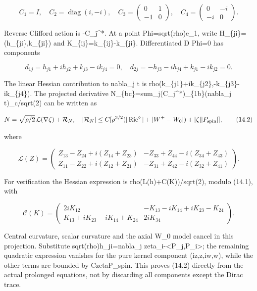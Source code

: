 \documentclass[
  10pt,
]{article}
\begin{document}
\[
 C_1=I,\quad C_2=\operatorname{diag}(i,-i),\quad
 C_3=\begin{pmatrix}0&1\\-1&0\end{pmatrix},\quad
 C_4=\begin{pmatrix}0&-i\\-i&0\end{pmatrix}.
\]

Reverse Clifford action is -C\_j\^{}*. At a point Phi=sqrt(rho)e\_1,
write H\_\{ji\}=(h\_\{ji\},k\_\{ji\}) and K\_\{ij\}=k\_\{ij\}-k\_\{ji\}.
Differentiated D Phi=0 has components

\[
 d_{1j}=h_{j1}+ih_{j2}+k_{j3}-ik_{j4}=0,\quad
 d_{2j}=-h_{j3}-ih_{j4}+k_{j1}-ik_{j2}=0.              \tag{14.1}
\]

The linear Hessian contribution to nabla\_j t is
rho(k\_\{j1\}+ik\_\{j2\},-k\_\{j3\}-ik\_\{j4\}). The projected
derivative N\_\{bc\}=sum\_j(C\_j\^{}*)\_\{1b\}(nabla\_j t)\_c/sqrt(2)
can be written as

\[
 N=\sqrt{\rho/2}\,\mathcal L(\nabla\zeta)+\mathcal R_N,
 \quad |\mathcal R_N|\le C[\rho^{3/2}(|\operatorname{Ric}^{\circ}|
                        +|W^+-W_0|)+|\zeta||P_{\rm spin}|],      \tag{14.2}
\]

where

\[
\mathcal L(Z)=\begin{pmatrix}
 Z_{13}-Z_{24}+i(Z_{14}+Z_{23})&-Z_{33}+Z_{44}-i(Z_{34}+Z_{43})\\
 Z_{11}-Z_{22}+i(Z_{12}+Z_{21})&-Z_{31}+Z_{42}-i(Z_{32}+Z_{41})
\end{pmatrix}.
\]

For verification the Hessian expression is rho(L(h)+C(K))/sqrt(2),
modulo (14.1), with

\[
\mathcal C(K)=\begin{pmatrix}
2iK_{12}&-K_{13}-iK_{14}+iK_{23}-K_{24}\\
K_{13}+iK_{23}-iK_{14}+K_{24}&2iK_{34}
\end{pmatrix}.
\]

Central curvature, scalar curvature and the axial W\_0 model cancel in
this projection. Substitute sqrt(rho)h\_ji=nabla\_j
zeta\_i-\textless P\_j,P\_i\textgreater; the remaining quadratic
expression vanishes for the pure kernel component (iz,z,iw,w), while the
other terms are bounded by
C\textbar zeta\textbar\textbar P\_spin\textbar. This proves (14.2)
directly from the actual prolonged equations, not by discarding all
components except the Dirac trace.
\end{document}
